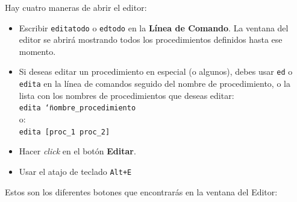 Hay cuatro maneras de abrir el editor:
\begin{itemize}
   \item Escribir \texttt{editatodo} o
      \texttt{edtodo} en la
      \textbf{L\'inea de Comando}. La ventana del editor se abrir\'a
      mostrando todos los procedimientos definidos hasta ese momento.
   \item Si deseas editar un procedimiento en especial (o algunos), debes
      usar \texttt{ed} o \texttt{edita}
      en la l\'inea de comandos seguido del nombre de procedimiento, o la lista con los
      nombres de procedimientos que deseas editar: \\
      \texttt{edita \char`\"{}nombre\_procedimiento} \\
      o: \\
      \texttt{edita [proc\_1 proc\_2]}
   \item Hacer \textit{click} en el bot\'on \textbf{Editar}.
   \item Usar el atajo de teclado \texttt{Alt+E}
\end{itemize}
Estos son los diferentes botones que encontrar\'as en la ventana del
Editor:
